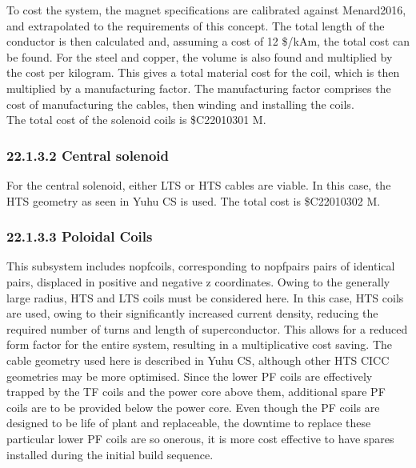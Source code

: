 To cost the system, the magnet specifications are calibrated against Menard2016,
and extrapolated to the requirements of this concept. The total length of the conductor is then calculated and, assuming a cost of 12 \$/kAm, the total cost can be found. For the steel and copper, the volume is also found and multiplied by the cost per kilogram. This gives a total material cost for the coil, which is then multiplied by a manufacturing factor. The manufacturing factor comprises the cost of manufacturing the cables, then winding and installing the coils. \\

The total cost of the solenoid coils is \$C22010301 M.

\subsubsection*{22.1.3.2 Central solenoid}

For the central solenoid, either LTS or HTS cables are viable. In this case, the HTS geometry as seen in Yuhu CS
is used. The total cost is \$C22010302 M.

\subsubsection*{22.1.3.3 Poloidal Coils}

This subsystem includes nopfcoils, corresponding to nopfpairs pairs of identical pairs, displaced in positive and negative z coordinates. Owing to the generally large radius, HTS and LTS coils must be considered here. In this case, HTS coils are used, owing to their significantly increased current density, reducing the required number of turns and length of superconductor. This allows for a reduced form factor for the entire system, resulting in a multiplicative cost saving. The cable geometry used here is described in Yuhu CS,
although other HTS CICC geometries may be more optimised.
Since the lower PF coils are effectively trapped by the TF coils and the power core above them, additional spare PF coils are to be provided below the power core. Even though the PF coils are designed to be life of plant and replaceable, the downtime to replace these particular lower PF coils are so onerous, it is more cost effective to have spares installed during the initial build sequence.  \\

